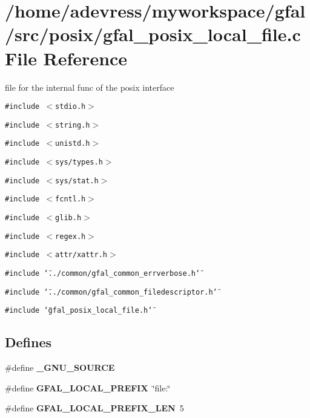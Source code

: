 \section{/home/adevress/myworkspace/gfal/src/posix/gfal\_\-posix\_\-local\_\-file.c File Reference}
\label{gfal__posix__local__file_8c}
file for the internal func of the posix interface 

{\tt \#include $<$stdio.h$>$}\par
{\tt \#include $<$string.h$>$}\par
{\tt \#include $<$unistd.h$>$}\par
{\tt \#include $<$sys/types.h$>$}\par
{\tt \#include $<$sys/stat.h$>$}\par
{\tt \#include $<$fcntl.h$>$}\par
{\tt \#include $<$glib.h$>$}\par
{\tt \#include $<$regex.h$>$}\par
{\tt \#include $<$attr/xattr.h$>$}\par
{\tt \#include \char`\"{}../common/gfal\_\-common\_\-errverbose.h\char`\"{}}\par
{\tt \#include \char`\"{}../common/gfal\_\-common\_\-filedescriptor.h\char`\"{}}\par
{\tt \#include \char`\"{}gfal\_\-posix\_\-local\_\-file.h\char`\"{}}\par
\subsection*{Defines}
\begin{CompactItemize}
\item 
\#define \textbf{\_\-GNU\_\-SOURCE}\label{gfal__posix__local__file_8c_53abf256730d533302d1910e5fb61efe}

\item 
\#define \textbf{GFAL\_\-LOCAL\_\-PREFIX}~\char`\"{}file:\char`\"{}\label{gfal__posix__local__file_8c_72e3f23638773071a6db4d9a354ccfdb}

\item 
\#define \textbf{GFAL\_\-LOCAL\_\-PREFIX\_\-LEN}~5\label{gfal__posix__local__file_8c_ff19b1b9a266e6b8e76d0262b53d7a1a}

\end{CompactItemize}
